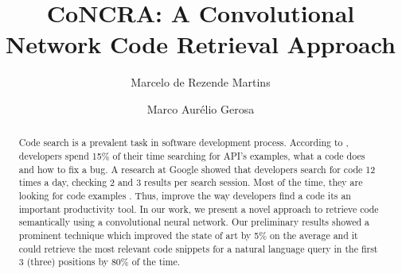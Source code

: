 \documentclass[sigconf]{acmart}
\begin{document}
\title{CoNCRA: A Convolutional Network Code Retrieval Approach}

\author{Marcelo de Rezende Martins}


\author{Marco Aurélio Gerosa}



\begin{abstract}
   Code search is a prevalent task in software development process. According to \cite{what-developers-search-for-on-the-web:xia:2017}, developers spend 15\% of their time searching for API's examples, what a code does and how to fix a bug. A research at Google showed that developers search for code 12 times a day, checking 2 and 3 results per search session. Most of the time, they are looking for code examples \citep{sadowski-how-developers-search-for-code-case-study:2015}. Thus, improve the way developers find a code its an important productivity tool. In our work, we present a novel approach to retrieve code semantically using a convolutional neural network. Our preliminary results showed a prominent technique which improved the state of art \citep{cambronero-deep-code-search-2019} by 5\% on the average and it could retrieve the most relevant code snippets for a natural language query in the first 3 (three) positions by 80\% of the time. 
\end{abstract}
\end{document}
